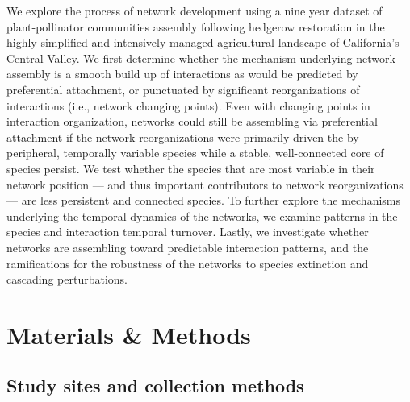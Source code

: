 \documentclass[12pt]{article}
\begin{document}
We explore the process of network development using a nine year
dataset of plant-pollinator communities assembly following hedgerow
restoration in the highly simplified and intensively managed
agricultural landscape of California's Central Valley.  We first
determine whether the mechanism underlying network assembly is a
smooth build up of interactions as would be predicted by preferential
attachment, or punctuated by significant reorganizations of
interactions (i.e., network changing points). Even with changing
points in interaction organization, networks could still be assembling
via preferential attachment if the network reorganizations were
primarily driven the by peripheral, temporally variable species while
a stable, well-connected core of species persist. We test whether the
species that are most variable in their network position --- and thus
important contributors to network reorganizations --- are less persistent
and connected species. To further explore the mechanisms underlying
the temporal dynamics of the networks, we examine patterns in the
species and interaction temporal turnover. Lastly, we investigate
whether networks are assembling toward predictable interaction
patterns, and the ramifications for the robustness of the networks to
species extinction and cascading perturbations.


\section*{Materials \& Methods}
\label{sec:methods}

\subsection*{Study sites and collection methods}
\label{sec:study-sites}
\end{document}
